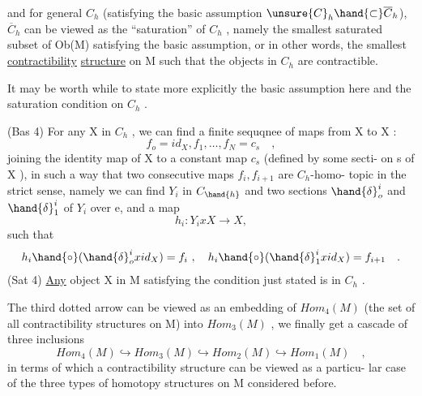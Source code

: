 and for general $C_h$ (satisfying the basic assumption $\unsure{C}_h \hand{\subset} \overline{C}_h$), $\overline{C}_h$ can be
viewed as the ``saturation'' of $C_h$ , namely the smallest saturated subset
of Ob(M) satisfying the basic assumption, or in other words, the
smallest \uline{contractibility} \uline{structure} on M\hand{,}  such that the objects
in $C_h$ are contractible.

It may be worth while to state more explicitly the basic assumption
here\hand{,} and the saturation condition on $C_h$ .

(Bas 4) For any X in $C_h$ , we can find a finite sequqnee of maps
from X to X :
\[ f_o=id_X, f_1, \ldots, f_N=c_s \quad , \]
joining the identity map of X to a constant map $c_s$ (defined by some secti-%
on s of X ), in such a way that two consecutive maps $f_i,f_{i+1}$ are $C_h$-homo-%
topic in the strict sense\hand{\unsure{*}}, namely we can find $Y_i$ in $C_{\hand{h}}$ and two sections
$\hand{\delta}^i_o$ and $\hand{\delta}^i_1$ of $Y_i$ over e, and a map
\[ h_i : Y_i x X \longrightarrow X , \]
such that
\[ h_i\hand{\circ}(\hand{\delta}^i_o x id_X) = f_i \ , \quad h_i\hand{\circ}(\hand{\delta}^i_1 x id_X) = f_{i+1} \quad . \]
(Sat 4)  \uline{Any} object X in M satisfying the condition just stated is
in $C_h$ .

The third dotted arrow can be viewed\hand{,} as  an embedding of $Hom_4(M)$
(the set of all contractibility structures on M) into $Hom_3(M)$ , we finally
get a cascade of three inclusions
\[ Hom_4(M) \hookrightarrow Hom_3(M) \hookrightarrow Hom_2(M) \hookrightarrow Hom_1(M) \quad , \]
in terms of which a contractibility structure  can be viewed as a particu-%
lar case of  the three types of homotopy structures on M considered before.


